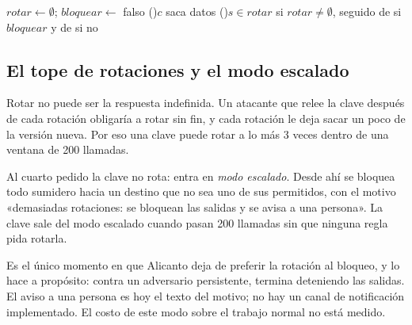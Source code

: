 \begin{algorithm}[ht]
\caption{La regla de decisión (), después de medir.}\label{alg:decide}
$\mathit{rotar} \leftarrow \emptyset$; $\mathit{bloquear} \leftarrow$ falso\;
\If(){$c$ saca datos}{
}
\ForEach(){$s \in \mathit{rotar}$}{
}
\Return {} si $\mathit{rotar} \neq \emptyset$, seguido de  si $\mathit{bloquear}$ y de  si no\;
\end{algorithm}

\subsection{El tope de rotaciones y el modo escalado}\label{sec:escalado}

Rotar no puede ser la respuesta indefinida. Un atacante que relee la clave después de cada rotación
obligaría a rotar sin fin, y cada rotación le deja sacar un poco de la versión nueva. Por eso una clave
puede rotar a lo más 3 veces dentro de una ventana de 200 llamadas.

Al cuarto pedido la clave no rota: entra en \emph{modo escalado}. Desde ahí se bloquea todo sumidero
hacia un destino que no sea uno de sus permitidos, con el motivo «demasiadas rotaciones: se bloquean
las salidas y se avisa a una persona». La clave sale del modo escalado cuando pasan 200 llamadas sin
que ninguna regla pida rotarla.

Es el único momento en que Alicanto deja de preferir la rotación al bloqueo, y lo hace a propósito:
contra un adversario persistente, termina deteniendo las salidas. El aviso a una persona es hoy el
texto del motivo; no hay un canal de notificación implementado. El costo de este modo sobre el trabajo
normal no está medido.

